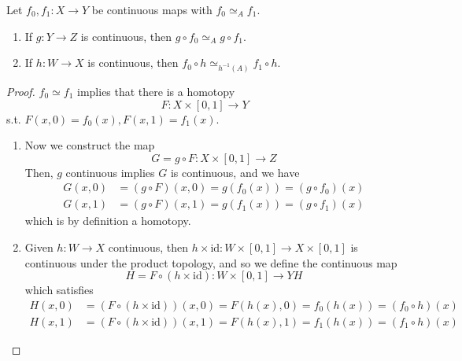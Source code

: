  \begin{lemma}
    Let $f_0, f_1: X \to Y$ be continuous maps with $f_0 \simeq_A f_1$. 
    \begin{enumerate}
      \item If $g: Y \to Z$ is continuous, then $g \circ f_0 \simeq_A g \circ f_1$. 
      \item If $h: W \to X$ is continuous, then $f_0 \circ h \simeq_{h^{-1}(A)} f_1 \circ h$. 
    \end{enumerate}
  \end{lemma}
  \begin{proof}
    $f_0 \simeq f_1$ implies that  there is a homotopy 
    \begin{equation}
      F: X \times [0, 1] \to Y
    \end{equation}
    s.t. $F(x, 0) = f_0 (x), F(x, 1) = f_1 (x)$. 
    \begin{enumerate}
      \item Now we construct the map 
        \begin{equation}
          G = g \circ F : X \times [0, 1] \to Z
        \end{equation}
        Then, $g$ continuous implies $G$ is continuous, and we have 
        \begin{align}
          G(x, 0) & = (g \circ F)(x, 0) = g(f_0(x)) = (g \circ f_0) (x) \\ 
          G(x, 1) & = (g \circ F)(x, 1) = g(f_1(x)) = (g \circ f_1) (x) 
        \end{align}
        which is by definition a homotopy. 
        
      \item Given $h: W \to X$ continuous, then $h \times \mathrm{id} : W \times [0, 1] \to X \times [0, 1]$ is continuous under the product topology, and so we define the continuous map 
        \begin{equation}
          H = F \circ (h \times \mathrm{id}): W \times [0, 1] \to YH
        \end{equation}
        which satisfies 
        \begin{align}
          H(x, 0) & =  (F \circ (h \times \mathrm{id})) (x, 0) = F(h(x), 0) = f_0(h(x)) = (f_0 \circ h) (x) \\ 
          H(x, 1) & =  (F \circ (h \times \mathrm{id})) (x, 1) = F(h(x), 1) = f_1(h(x)) = (f_1 \circ h) (x) 
        \end{align}
    \end{enumerate}
  \end{proof}

